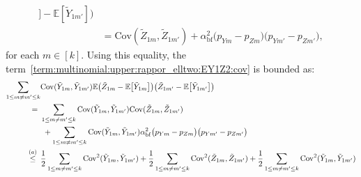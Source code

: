 \documentclass[twoside,11pt]{article}
\newcommand{\rvTwo}{Y}
\newcommand{\rvThree}{Z}
\newcommand{\private}[1]{\tilde{#1}}
\newcommand{\mE}{\mathbb{E}} %
\newcommand{\alphabetSize}{k} %
\newcommand{\vectorIndex}{m}
\newcommand{\probVecElement}[2]{p_{{#1}{#2}}}
\newcommand{\privacyParameter}{\alpha} %
\newcommand{\privacyParameterrappor}{\privacyParameter_{\mathrm{bf}}}
\begin{document}
\begin{appendix}
\begin{align*}
		]
		-
		\mE
		[
		\private{\rvTwo}_{1 \vectorIndex'}
		]
		)
		\\&=
		\mathrm{Cov}
		(
		\private{\rvThree}_{1 \vectorIndex}
		,
		\private{\rvThree}_{1 \vectorIndex'}
		)
		+
		\privacyParameterrappor^2
		\bigl(  \probVecElement{\rvTwo}{\vectorIndex} - \probVecElement{\rvThree}{\vectorIndex}\bigr)
		\bigl(  \probVecElement{\rvTwo}{\vectorIndex'} - \probVecElement{\rvThree}{\vectorIndex'}\bigr),
	\end{align*}
	for each $\vectorIndex \in [\alphabetSize]$.
	Using this equality, the term~\eqref{term:multinomial:upper:rappor_elltwo:EY1Z2:cov} is bounded as:
	\begin{align*}
		\sum_{1 \leq \vectorIndex \neq \vectorIndex' \leq \alphabetSize}
		&%
		\mathrm{Cov}(\private{Y}_{1 \vectorIndex}, \private{Y}_{1 \vectorIndex'})
		\mE
		\bigl( %
		\private{\rvThree}_{1 \vectorIndex}
		-
		\mE
		\bigl[
		\private{\rvTwo}_{1 \vectorIndex}
		\bigr]
		\bigr)%
		\bigl( %
		\private{\rvThree}_{1 \vectorIndex'}
		-
		\mE
		\bigl[
		\private{\rvTwo}_{1 \vectorIndex'}
		\bigr]
		\bigr)
		\\ = ~ &
		\sum_{1 \leq \vectorIndex \neq \vectorIndex' \leq \alphabetSize}
		\mathrm{Cov}(\private{Y}_{1 \vectorIndex}, \private{Y}_{1 \vectorIndex'})
		\mathrm{Cov}
		(
		\private{\rvThree}_{1 \vectorIndex}
		,
		\private{\rvThree}_{1 \vectorIndex'}
		)
		\\
		&~+
		\sum_{1 \leq \vectorIndex \neq \vectorIndex' \leq \alphabetSize}
		\mathrm{Cov}(\private{Y}_{1 \vectorIndex}, \private{Y}_{1 \vectorIndex'})
		\privacyParameterrappor^2
		\bigl(  \probVecElement{\rvTwo}{\vectorIndex} - \probVecElement{\rvThree}{\vectorIndex}\bigr)
		\bigl(  \probVecElement{\rvTwo}{\vectorIndex'} - \probVecElement{\rvThree}{\vectorIndex'}\bigr)
		\\ \stackrel{(a)}{\leq} \hskip 1.57mm &
		\frac{1}{2}\sum_{1 \leq \vectorIndex \neq \vectorIndex' \leq \alphabetSize}
		\mathrm{Cov}^2(\private{Y}_{1 \vectorIndex}, \private{Y}_{1 \vectorIndex'})
		+
		\frac{1}{2}\sum_{1 \leq \vectorIndex \neq \vectorIndex' \leq \alphabetSize}
		\mathrm{Cov}^2
		(
		\private{\rvThree}_{1 \vectorIndex}
		,
		\private{\rvThree}_{1 \vectorIndex'}
		)
		+
		\frac{1}{2}\sum_{1 \leq \vectorIndex \neq \vectorIndex' \leq \alphabetSize}
		\mathrm{Cov}^2(\private{Y}_{1 \vectorIndex}, \private{Y}_{1 \vectorIndex'})

\end{align*}
\end{appendix}
\end{document}
